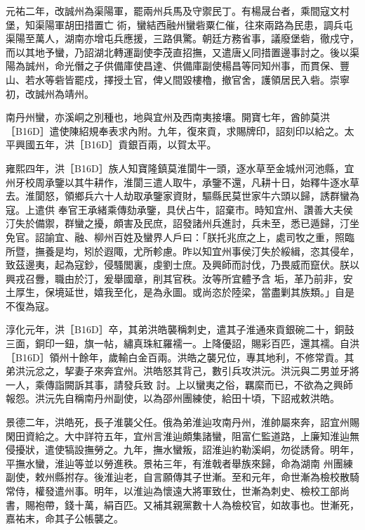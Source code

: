 \begin{pinyinscope}
 元祐二年，改誠州為渠陽軍，罷兩州兵馬及守禦民丁。有楊晟台者，乘間寇文村堡，知渠陽軍胡田措置亡
 術，蠻結西融州蠻砦粟仁催，往來兩路為民患，調兵屯渠陽至萬人，湖南亦增屯兵應援，三路俱驚。朝廷方務省事，議廢堡砦，徹戍守，而以其地予蠻，乃詔湖北轉運副使李茂直招撫，又遣唐乂同措置邊事討之。後以渠陽為誠州，命光僭之子供備庫使昌達、供備庫副使楊昌等同知州事，而貫保、豐山、若水等砦皆罷戍，擇授土官，俾乂間毀樓櫓，撤官舍，護領居民入砦。崇寧初，改誠州為靖州。



 南丹州蠻，亦溪峒之別種也，地與宜州及西南夷接壤。開寶七年，酋帥莫洪［B16D］遣使陳紹規奉表求內附。九年，復來貢，求賜牌印，詔刻印以給之。太平興國五年，洪［B16D］貢銀百兩，以賀太平。



 雍熙四年，洪［B16D］族人知寶隆鎮莫淮閬牛一頭，逐水草至金城州河池縣，宜州牙校周承鑒以其牛耕作，淮閬三遣人取牛，承鑒不還，凡耕十日，始釋牛逐水草去。淮閬怒，領鄉兵六十人劫取承鑒家資財，驅縣民莫世家牛六頭以歸，誘群蠻為寇。上遣供
 奉官王承緒乘傳劾承鑒，具伏占牛，詔棄市。時知宜州、讚善大夫侯汀失於備禦，群蠻之擾，頗害及民庶，詔發諸州兵進討，兵未至，悉已遁歸，汀坐免官。詔諭宜、融、柳州百姓及蠻界人戶曰：「朕托兆庶之上，處司牧之重，照臨所暨，撫養是均，矧於遐陬，尤所軫慮。昨以知宜州事侯汀失於綏緝，恣其侵牟，致茲邊夷，起為寇鈔，侵騷閭裏，虔劉士庶。及興師而討伐，乃畏威而竄伏。朕以興戎召釁，職由於汀，爰舉國章，削其官秩。汝等所宜體予含
 垢，革乃前非，安土厚生，保境延世，嬉我至化，是為永圖。或尚恣於陸梁，當盡剿其族類。」自是不復為寇。



 淳化元年，洪［B16D］卒，其弟洪皓襲稱刺史，遣其子淮通來貢銀碗二十，銅鼓三面，銅印一鈕，旗一帖，繡真珠紅羅襦一。上降優詔，賜彩百匹，還其襦。自洪［B16D］領州十餘年，歲輸白金百兩。洪皓之襲兄位，專其地利，不修常貢。其弟洪沅忿之，挈妻子來奔宜州。洪皓怒其背己，數引兵攻洪沅。洪沅與二男並牙將一人，乘傳詣闕訴其事，請發兵致
 討。上以蠻夷之俗，羈縻而已，不欲為之興師報怨。洪沅先自稱南丹州副使，以為邵州團練使，給田十頃，下詔戒敕洪皓。



 景德二年，洪皓死，長子淮襲父任。俄為弟淮辿攻南丹州，淮帥屬來奔，詔宜州賜閑田資給之。大中詳符五年，宜州言淮辿頗集諸蠻，阻富仁監道路，上廉知淮辿無侵擾狀，遣使犒設撫勞之。九年，撫水蠻叛，詔淮辿約勒溪峒，勿從誘脅。明年，平撫水蠻，淮辿等並以勞進秩。景祐三年，有淮戟者舉族來歸，命為湖南
 州團練副使，敕州縣拊存。後淮辿老，自言願傳其子世漸。至和元年，命世漸為檢校散騎常侍，權發遣州事。明年，以淮辿為懷遠大將軍致仕，世漸為刺史、檢校工部尚書，賜袍帶，錢十萬，絹百匹。又補其親黨數十人為檢校官，如故事也。世漸死，嘉祐末，命其子公帳襲之。




\end{pinyinscope}
